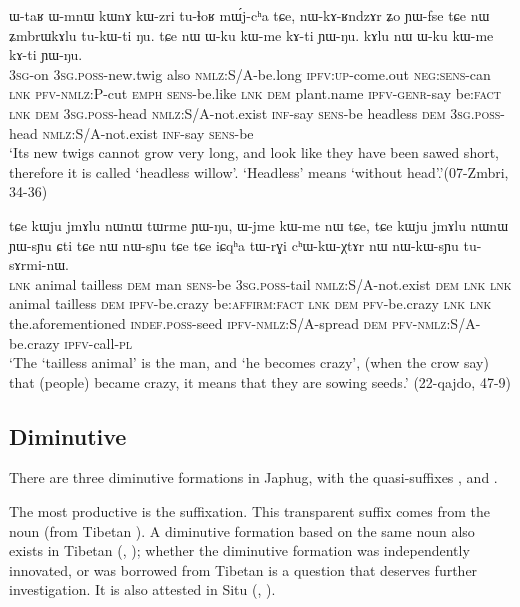 \begin{exe}
\ex \label{ex:kAlu}
\gll ɯ-taʁ ɯ-mnɯ kɯnɤ kɯ-zri tu-ɬoʁ mɯ́j-cʰa tɕe, nɯ-kɤ-ʁndzɤr ʑo ɲɯ-fse tɕe nɯ ʑmbrɯkɤlu tu-kɯ-ti ŋu. tɕe nɯ ɯ-ku kɯ-me kɤ-ti ɲɯ-ŋu.  kɤlu nɯ ɯ-ku kɯ-me kɤ-ti ɲɯ-ŋu.\\
\textsc{3sg}-on \textsc{3sg.poss}-new.twig also \textsc{nmlz}:S/A-be.long \textsc{ipfv}:\textsc{up}-come.out \textsc{neg:sens}-can \textsc{lnk} \textsc{pfv}-\textsc{nmlz}:P-cut \textsc{emph} \textsc{sens}-be.like \textsc{lnk} \textsc{dem} plant.name \textsc{ipfv}-\textsc{genr}-say be:\textsc{fact} \textsc{lnk}  \textsc{dem} \textsc{3sg.poss}-head \textsc{nmlz}:S/A-not.exist \textsc{inf}-say \textsc{sens}-be headless \textsc{dem} \textsc{3sg.poss}-head \textsc{nmlz}:S/A-not.exist \textsc{inf}-say \textsc{sens}-be\\
\glt `Its new twigs cannot grow very long, and look like they have been sawed short, therefore it is called `headless willow'. `Headless' means `without head'.'(07-Zmbri, 34-36)
\end{exe}

\begin{exe}
\ex \label{ex:jmAlu}
\gll tɕe kɯju jmɤlu nɯnɯ tɯrme ɲɯ-ŋu, ɯ-jme kɯ-me nɯ tɕe, tɕe kɯju jmɤlu nɯnɯ ɲɯ-sɲu ɕti tɕe nɯ  nɯ-sɲu tɕe tɕe iɕqʰa tɯ-rɣi cʰɯ-kɯ-χtɤr nɯ nɯ-kɯ-sɲu tu-sɤrmi-nɯ. \\
\textsc{lnk} animal tailless \textsc{dem} man \textsc{sens}-be \textsc{3sg.poss}-tail \textsc{nmlz}:S/A-not.exist \textsc{dem} \textsc{lnk} \textsc{lnk} animal tailless  \textsc{dem} \textsc{ipfv}-be.crazy  be:\textsc{affirm}:\textsc{fact} \textsc{lnk} \textsc{dem} \textsc{pfv}-be.crazy \textsc{lnk} \textsc{lnk} the.aforementioned \textsc{indef.poss}-seed \textsc{ipfv}-\textsc{nmlz}:S/A-spread \textsc{dem} \textsc{pfv}-\textsc{nmlz}:S/A-be.crazy \textsc{ipfv}-call-\textsc{pl} \\
\glt `The `tailless animal' is the man, and `he becomes crazy', (when the crow say) that (people) became crazy, it means that they are sowing seeds.' (22-qajdo, 47-9)
\end{exe}

\subsection{Diminutive} \label{sec:diminutive}
There are three diminutive formations in Japhug, with the quasi-suffixes ,  and .

The most productive is the  suffixation. This transparent suffix comes from the noun  (from Tibetan ). A diminutive formation based on the same noun also exists in Tibetan (\citealt{uray52diminutive},  \citealt[627]{hill14derivational}); whether the diminutive formation was independently innovated, or was borrowed from Tibetan is a question that deserves further investigation. It is also attested in Situ (\citealt{zhang16bragdbar}, \citealt[151]{lai17khroskyabs}).

